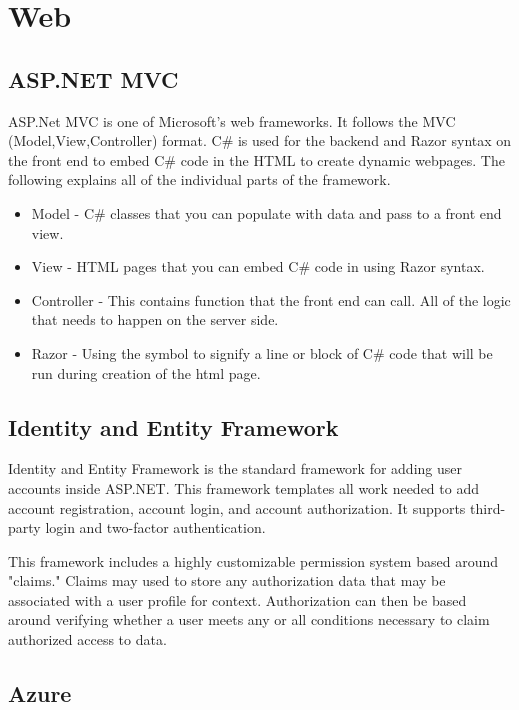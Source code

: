 
\section{Web}

\subsection{ASP.NET MVC}
ASP.Net MVC is one of Microsoft's web frameworks. It follows the MVC (Model,View,Controller) format.
C\# is used for the backend and Razor syntax on the front end to embed C\# code in the HTML to create dynamic webpages.
The following explains all of the individual parts of the framework.

\begin{itemize}
    \item Model - C\# classes that you can populate with data and pass to a front end view.
    \item View - HTML pages that you can embed C\# code in using Razor syntax.
    \item Controller - This contains function that the front end can call. All of the logic that needs to happen on the server side.
    \item Razor - Using the \@ symbol to signify a line or block of C\# code that will be run during creation of the html page.
\end{itemize}

\subsection{Identity and Entity Framework}
Identity and Entity Framework is the standard framework for adding user accounts inside ASP.NET. This framework templates all work needed to add account registration, account login, and account authorization. It supports third-party login and two-factor authentication. 

This framework includes a highly customizable permission system based around "claims." Claims may used to store any authorization data that may be associated with a user profile for context. Authorization can then be based around verifying whether a user meets any or all conditions necessary to claim authorized access to data. 

\subsection{Azure}
